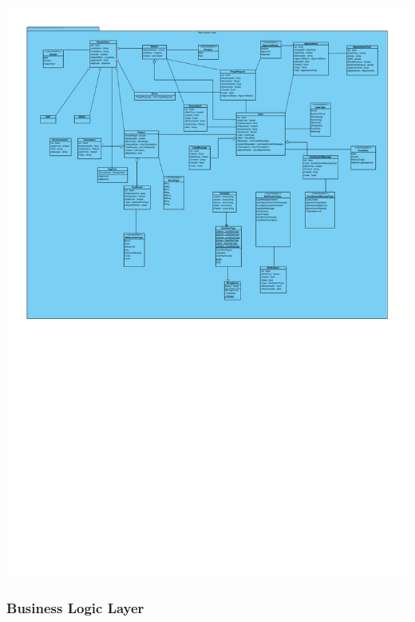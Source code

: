 \documentclass[a4paper, 12pt, titlepage]{article}
\begin{document}
  \includegraphics[width=\linewidth]{dataaccess}

  \subsubsection{Business Logic Layer}
\end{document}
